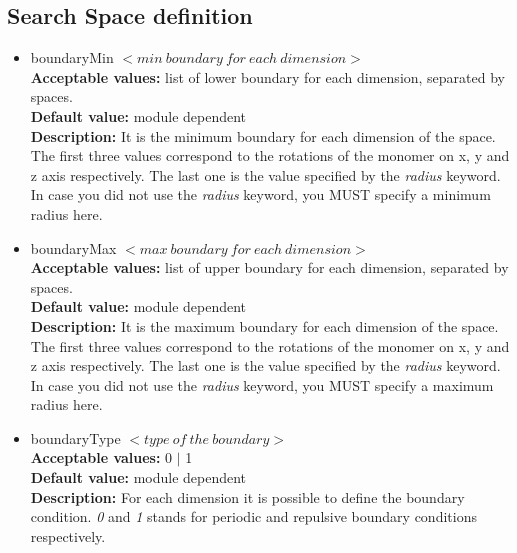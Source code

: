 \documentclass[a4paper, 12pt]{article}
\begin{document}
\subsection{Search Space definition}

\begin{itemize}

\item boundaryMin $< min\ boundary\ for\ each\ dimension >$\\
\textbf{Acceptable values:} list of lower boundary for each dimension, separated by spaces.\\
\textbf{Default value:} module dependent \\
\textbf{Description:} It is the minimum boundary for each dimension of the space. The first three values correspond to the rotations of the monomer on x, y and z axis respectively. The last one is the value specified by the \emph{radius} keyword. In case you did not use the \emph{radius} keyword, you MUST specify a minimum radius here.

\item boundaryMax $< max\ boundary\ for\ each\ dimension >$\\
\textbf{Acceptable values:} list of upper boundary for each dimension, separated by spaces.\\
\textbf{Default value:} module dependent\\
\textbf{Description:} It is the maximum boundary for each dimension of the space. The first three values correspond to the rotations of the monomer on x, y and z axis respectively. The last one is the value specified by the \emph{radius} keyword. In case you did not use the \emph{radius} keyword, you MUST specify a maximum radius here.

\item boundaryType $< type\ of\ the\ boundary >$\\
\textbf{Acceptable values:} 0 $|$ 1\\
\textbf{Default value:} module dependent\\
\textbf{Description:} For each dimension it is possible to define the boundary condition. \emph{0} and  \emph{1} stands for periodic and repulsive boundary conditions respectively.


\end{itemize}
\end{document}
